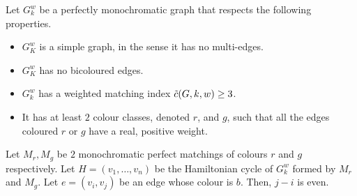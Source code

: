 \begin{observation}
    \label{obs:2_positive_classes_parity_crossing_edge}
    Let $G_k^w$ be a perfectly monochromatic graph that respects the following properties.
    \begin{itemize}
        \item $G_K^w$ is a simple graph, in the sense it has no multi-edges.
        \item $G_K^w$ has no bicoloured edges.
        \item $G_k^w$ has a weighted matching index $\Tilde{c}(G, k, w) \geq 3$.
        \item It has at least $2$ colour classes, denoted $r$, and $g$, such that all the edges coloured $r$ or $g$ have a real, positive weight.
    \end{itemize}
    Let $M_r, M_g$ be $2$ monochromatic perfect matchings of colours $r$ and $g$ respectively.
    Let $H = (v_1, \dots, v_n)$ be the Hamiltonian cycle of $G_k^w$ formed by $M_r$ and $M_g$.
    Let $e = (v_i, v_j)$ be an edge whose colour is $b$.
    Then, $j-i$ is even.
\end{observation}

